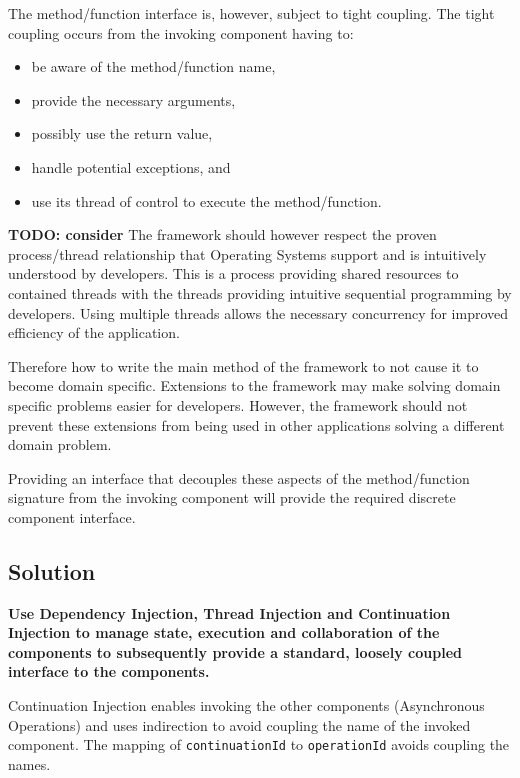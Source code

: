 \documentclass[prodmode]{style/acmlarge}
\begin{document}
The method/function interface is, however, subject to tight coupling.  The tight
coupling occurs from the invoking component having to:
\begin{itemize}
  \item be aware of the method/function name,
  \item provide the necessary arguments,
  \item possibly use the return value,
  \item handle potential exceptions, and
  \item use its thread of control to execute the method/function.
\end{itemize}

\textbf{TODO: consider} The framework should however respect the proven
process/thread relationship that Operating Systems support and is intuitively
understood by developers.  This is a process providing shared resources to
contained threads with the threads providing intuitive sequential programming by
developers.  Using multiple threads allows the necessary concurrency for
improved efficiency of the application.

Therefore how to write the main method of the framework to not cause it to become
domain specific.  Extensions to the framework may make solving domain specific
problems easier for developers.  However, the framework should not prevent these
extensions from being used in other applications solving a different domain
problem.

Providing an interface that decouples these aspects of the method/function
signature from the invoking component will provide the required discrete
component interface.


\subsection{Solution}


\textbf{Use Dependency Injection, Thread Injection and Continuation Injection to manage state, execution and collaboration of the components to subsequently provide a standard, loosely coupled interface to the components.}

Continuation Injection enables invoking the other components (Asynchronous
Operations) and uses indirection to avoid coupling the name of the invoked
component.  The mapping of \texttt{continuationId} to \texttt{operationId}
avoids coupling the names.
\end{document}
